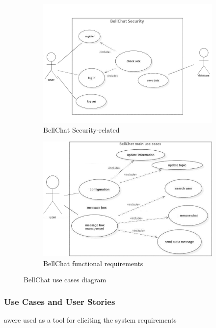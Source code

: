 \documentclass{svproc}
\begin{document}
\begin{figure}
	\centering
	\begin{subfigure}[b]{0.49\textwidth}
		\centering
		\includegraphics[width=\textwidth]{figures/fig1a.png}
		\caption{BellChat Security-related}
		\label{fig:fig1a}
	\end{subfigure}
	\begin{subfigure}[b]{0.49\textwidth}
		\centering
		\includegraphics[width=\textwidth]{figures/fig1b.png}
		\caption{BellChat functional requirements}
		\label{fig:fig1b}
	\end{subfigure}
	\caption{BellChat use cases diagram}
	\label{fig:fig1}
\end{figure}

\subsubsection{Use Cases and User Stories} awere used as a tool for eliciting the system requirements
\end{document}
